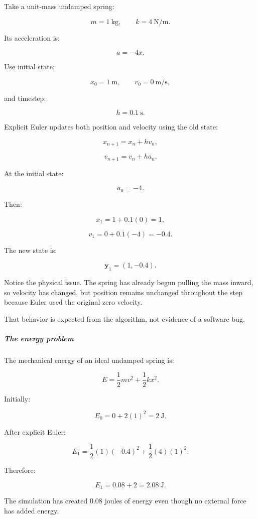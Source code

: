 \hypertarget{02-foundations-ii-ch025-explicit-euler-in-a-spring-simulation}{}

Take a unit-mass undamped spring:

\[
m=1\ \mathrm{kg}, \qquad k=4\ \mathrm{N/m}.
\]

Its acceleration is:

\[
a=-4x.
\]

Use initial state:

\[
x_0=1\ \mathrm m, \qquad v_0=0\ \mathrm{m/s},
\]

and timestep:

\[
h=0.1\ \mathrm s.
\]

Explicit Euler updates both position and velocity using the old state:

\[
x_{n+1}=x_n+hv_n,
\]

\[
v_{n+1}=v_n+ha_n.
\]

At the initial state:

\[
a_0=-4.
\]

Then:

\[
x_1=1+0.1(0)=\boxed{1},
\]

\[
v_1=0+0.1(-4)=\boxed{-0.4}.
\]

The new state is:

\[
\boxed{\mathbf y_1=(1,-0.4)}.
\]

Notice the physical issue. The spring has already begun pulling the mass inward, so velocity has changed, but position remains unchanged throughout the step because Euler used the original zero velocity.

That behavior is expected from the algorithm, not evidence of a software bug.

\subparagraph{The energy problem}\label{02-foundations-ii-ch025-the-energy-problem}

\hypertarget{02-foundations-ii-ch025-the-energy-problem}{}

The mechanical energy of an ideal undamped spring is:

\[
E=\frac12mv^2+\frac12kx^2.
\]

Initially:

\[
E_0=0+2(1)^2=\boxed{2\ \mathrm J}.
\]

After explicit Euler:

\[
E_1= \frac12(1)(-0.4)^2+ \frac12(4)(1)^2.
\]

Therefore:

\[
E_1=0.08+2=\boxed{2.08\ \mathrm J}.
\]

The simulation has created \(0.08\) joules of energy even though no external force has added energy.

